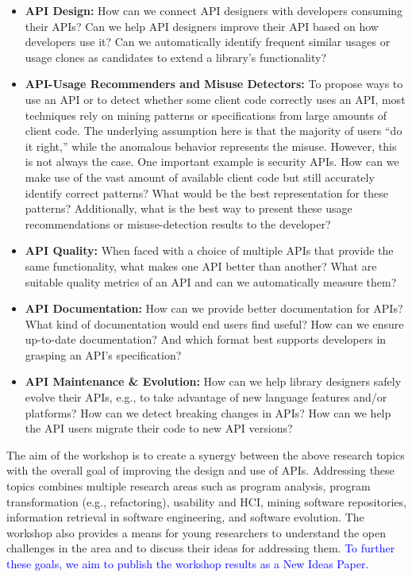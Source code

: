 \documentclass[10pt, conference]{IEEEtran}
\newcommand{\updated}[1]{{\textcolor{blue}{#1}}}
\begin{document}
\begin{itemize}
\setlength\itemsep{5pt}

\item \textbf{API Design:} How can we connect API designers with developers consuming their APIs? Can we help API designers improve their API based on how developers use it? Can we automatically identify frequent similar usages or usage clones as candidates to extend a library's functionality?

\item \textbf{API-Usage Recommenders and Misuse Detectors:} To propose ways to use an API or to detect whether some client code correctly uses an API, most techniques rely on mining patterns or specifications from large amounts of client code. The underlying assumption here is that the majority of users ``do it right,'' while the anomalous behavior represents the misuse. However, this is not always the case. One important example is security APIs. How can we make use of the vast amount of available client code but still accurately identify correct patterns? What would be the best representation for these patterns? Additionally, what is the best way to present these usage recommendations or misuse-detection results to the developer? 

\item \textbf{API Quality:} When faced with a choice of multiple APIs that provide the same functionality, what makes one API better than another? What are suitable quality metrics of an API and can we automatically measure them?

\item\textbf{API Documentation:} How can we provide better documentation for APIs? What kind of documentation would end users find useful? How can we ensure up-to-date documentation? And which format best supports developers in grasping an API's specification?

\item \textbf{API Maintenance \& Evolution:} How can we help library designers safely evolve their APIs, e.g., to take advantage of new language features and/or platforms? How can we detect breaking changes in APIs? How can we help the API users migrate their code to new API versions?

\end{itemize}

The aim of the workshop is to create a synergy between the above research topics with the overall goal of improving the design and use of APIs. Addressing these topics combines multiple research areas such as program analysis, program transformation (e.g., refactoring), usability and HCI, mining software repositories, information retrieval in software engineering, and software evolution. The workshop also provides a means for young researchers to understand the open challenges in the area and to discuss their ideas for addressing them. \updated{To further these goals, we aim to publish the workshop results as a New Ideas Paper.}
\end{document}
